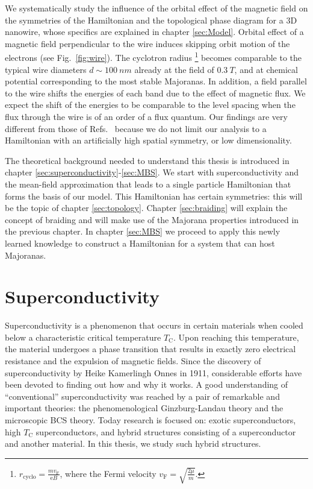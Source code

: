 We systematically study the influence of the orbital effect of the magnetic field on the symmetries of the Hamiltonian and the topological phase diagram for a 3D nanowire, whose specifics are explained in chapter \ref{sec:Model}.
Orbital effect of a magnetic field perpendicular to the wire induces skipping orbit motion of the electrons (see Fig.~\ref{fig:wire}).
The cyclotron radius \footnote{$r_{\textrm{cyclo}}=\frac{mv_{\textrm{F}}}{\textrm{e}B}$, where the Fermi velocity $v_{\textrm{F}}=\sqrt{\frac{2\mu}{m}}$.} becomes comparable to the typical wire diameters $d\sim\SI{100}{nm}$ already at the field of $\SI{0.3}{T}$, and at chemical potential corresponding to the most stable Majoranas.
In addition, a field parallel to the wire shifts the energies of each band due to the effect of magnetic flux.
We expect the shift of the energies to be comparable to the level spacing when the flux through the wire is of an order of a flux quantum.
Our findings are very different from those of Refs.~\cite{Osca2015a,Lim2012,SooLim2013} because we do not limit our analysis to a Hamiltonian with an artificially high spatial symmetry, or low dimensionality.

The theoretical background needed to understand this thesis is introduced in chapter \ref{sec:superconductivity}-\ref{sec:MBS}.
We start with superconductivity and the mean-field approximation that leads to a single particle Hamiltonian that forms the basis of our model.
This Hamiltonian has certain symmetries: this will be the topic of chapter \ref{sec:topology}.
Chapter \ref{sec:braiding} will explain the concept of braiding and will make use of the Majorana properties introduced in the previous chapter.
In chapter \ref{sec:MBS} we proceed to apply this newly learned knowledge to construct a Hamiltonian for a system that can host Majoranas.

\section{\label{sec:superconductivity}Superconductivity}

Superconductivity is a phenomenon that occurs in certain materials when cooled below a characteristic critical temperature $T_{\mathrm{C}}$.
Upon reaching this temperature, the material undergoes a phase transition that results in exactly zero electrical resistance and the expulsion of magnetic fields.
Since the discovery of superconductivity by Heike Kamerlingh Onnes in 1911, considerable efforts have been devoted to finding out how and why it works.
A good understanding of ``conventional'' superconductivity was reached by a pair of remarkable and important theories: the phenomenological Ginzburg-Landau theory and the microscopic BCS theory.
Today research is focused on: exotic superconductors, high $T_{\mathrm{C}}$ superconductors, and hybrid structures consisting of a superconductor and another material.
In this thesis, we study such hybrid structures.

